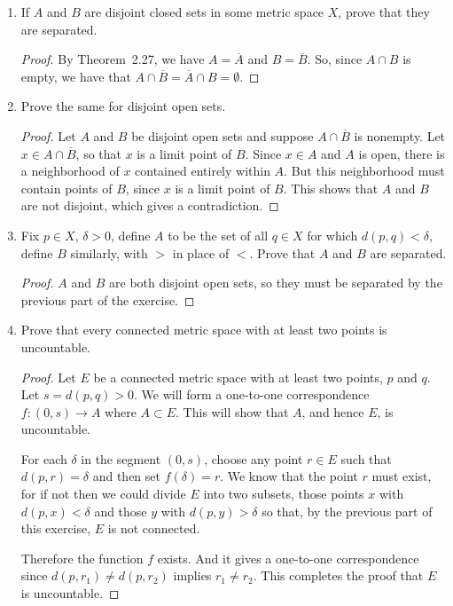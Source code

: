 
\begin{enumerate}
\item If $A$ and $B$ are disjoint closed sets in some metric space
  $X$, prove that they are separated.
  \begin{proof}
    By Theorem~2.27, we have $A = \overline{A}$ and
    $B = \overline{B}$. So, since $A\cap B$ is empty, we have that
    $A\cap\overline{B} = \overline{A}\cap B = \emptyset$.
  \end{proof}
\item Prove the same for disjoint open sets.
  \begin{proof}
    Let $A$ and $B$ be disjoint open sets and suppose
    $A\cap\overline{B}$ is nonempty. Let $x\in A\cap\overline{B}$, so
    that $x$ is a limit point of $B$. Since $x\in A$ and $A$ is open,
    there is a neighborhood of $x$ contained entirely within $A$. But
    this neighborhood must contain points of $B$, since $x$ is a limit
    point of $B$. This shows that $A$ and $B$ are not disjoint, which
    gives a contradiction.
  \end{proof}
\item Fix $p\in X$, $\delta > 0$, define $A$ to be the set of all
  $q\in X$ for which $d(p,q) < \delta$, define $B$ similarly, with $>$
  in place of $<$. Prove that $A$ and $B$ are separated.
  \begin{proof}
    $A$ and $B$ are both disjoint open sets, so they must be separated
    by the previous part of the exercise.
  \end{proof}
\item Prove that every connected metric space with at least two points
  is uncountable.
  \begin{proof}
    Let $E$ be a connected metric space with at least two points, $p$
    and $q$. Let $s = d(p,q) > 0$. We will form a one-to-one
    correspondence $f\colon(0,s)\to A$ where $A\subset E$. This will
    show that $A$, and hence $E$, is uncountable.

    For each $\delta$ in the segment $(0,s)$, choose any point
    $r\in E$ such that $d(p,r) = \delta$ and then set $f(\delta) =
    r$. We know that the point $r$ must exist, for if not then we
    could divide $E$ into two subsets, those points $x$ with
    $d(p,x) < \delta$ and those $y$ with $d(p,y) > \delta$ so that, by
    the previous part of this exercise, $E$ is not connected.

    Therefore the function $f$ exists. And it gives a one-to-one
    correspondence since $d(p,r_1)\neq d(p,r_2)$ implies
    $r_1\neq r_2$. This completes the proof that $E$ is uncountable.
  \end{proof}
\end{enumerate}

